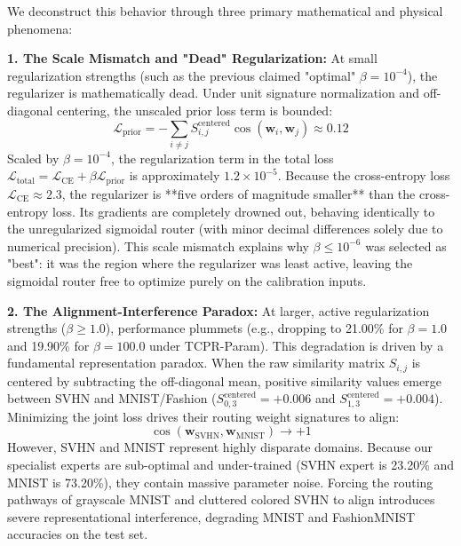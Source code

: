 We deconstruct this behavior through three primary mathematical and physical phenomena:

\textbf{1. The Scale Mismatch and "Dead" Regularization:}
At small regularization strengths (such as the previous claimed "optimal" $\beta = 10^{-4}$), the regularizer is mathematically dead. Under unit signature normalization and off-diagonal centering, the unscaled prior loss term is bounded:
\begin{equation}
    \mathcal{L}_{\text{prior}} = - \sum_{i \ne j} S^{\text{centered}}_{i, j} \cos(\mathbf{w}_i, \mathbf{w}_j) \approx 0.12
\end{equation}
Scaled by $\beta = 10^{-4}$, the regularization term in the total loss $\mathcal{L}_{\text{total}} = \mathcal{L}_{\text{CE}} + \beta \mathcal{L}_{\text{prior}}$ is approximately $1.2 \times 10^{-5}$. Because the cross-entropy loss $\mathcal{L}_{\text{CE}} \approx 2.3$, the regularizer is **five orders of magnitude smaller** than the cross-entropy loss. Its gradients are completely drowned out, behaving identically to the unregularized sigmoidal router (with minor decimal differences solely due to numerical precision). This scale mismatch explains why $\beta \le 10^{-6}$ was selected as "best": it was the region where the regularizer was least active, leaving the sigmoidal router free to optimize purely on the calibration inputs.

\textbf{2. The Alignment-Interference Paradox:}
At larger, active regularization strengths ($\beta \ge 1.0$), performance plummets (e.g., dropping to 21.00\% for $\beta = 1.0$ and 19.90\% for $\beta = 100.0$ under TCPR-Param). This degradation is driven by a fundamental representation paradox. When the raw similarity matrix $S_{i, j}$ is centered by subtracting the off-diagonal mean, positive similarity values emerge between SVHN and MNIST/Fashion ($S^{\text{centered}}_{0, 3} = +0.006$ and $S^{\text{centered}}_{1, 3} = +0.004$). Minimizing the joint loss drives their routing weight signatures to align:
\begin{equation}
    \cos(\mathbf{w}_{\text{SVHN}}, \mathbf{w}_{\text{MNIST}}) \to +1
\end{equation}
However, SVHN and MNIST represent highly disparate domains. Because our specialist experts are sub-optimal and under-trained (SVHN expert is 23.20\% and MNIST is 73.20\%), they contain massive parameter noise. Forcing the routing pathways of grayscale MNIST and cluttered colored SVHN to align introduces severe representational interference, degrading MNIST and FashionMNIST accuracies on the test set.

